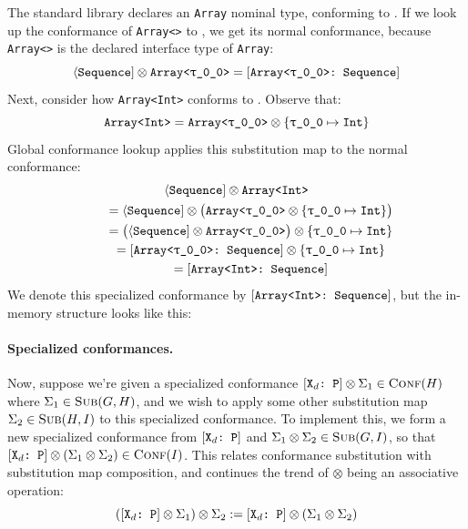 \documentclass[../generics]{subfiles}
\begin{document}
\begin{example}\label{specialized conf example}
The standard library declares an \texttt{Array} nominal type, conforming to \tSequence.
If we look up the conformance of \texttt{Array<\rT>} to \tSequence, we get its normal conformance, because \texttt{Array<\rT>} is the declared interface type of \texttt{Array}:
\[ \PSequence\otimes\texttt{Array<\rT>} = \ArraySequence \]
Next, consider how \texttt{Array<Int>} conforms to \tSequence. Observe that:
\[\texttt{Array<Int>} = \texttt{Array<\rT>} \otimes \SubMapInt\]
Global conformance lookup applies this substitution map to the normal conformance:
\begin{gather*}
\PSequence\otimes\texttt{Array<Int>}\\
\qquad {} = \PSequence\otimes\bigl(\texttt{Array<\rT>}\otimes\SubMapInt\bigr)\\
\qquad {} = \bigl(\PSequence\otimes\texttt{Array<\rT>}\bigr)\otimes\SubMapInt\\
\qquad {} = \ArraySequence\otimes\SubMapInt\\
\qquad {} = \ArrayIntSequence
\end{gather*}
We denote this specialized conformance by $[\texttt{Array<Int>:~Sequence}]$, but the in-memory structure looks like this:

\begin{center}
\end{center}
\end{example}

\paragraph{Specialized conformances.}
Now, suppose we're given a specialized conformance $[\texttt{$\texttt{X}_d$:~P}]\otimes\Sigma_1\in\textsc{Conf}({H})$ where $\Sigma_1\in\textsc{Sub}({G, H})$, and we wish to apply some other substitution map $\Sigma_2\in\textsc{Sub}({H, I})$ to this specialized conformance. To implement this, we form a new specialized conformance from $[\texttt{$\texttt{X}_d$:~P}]$ and $\Sigma_1 \otimes \Sigma_2 \in \textsc{Sub}({G, I})$, so that $[\texttt{$\texttt{X}_d$:~P}] \otimes (\Sigma_1\otimes\Sigma_2) \in \textsc{Conf}({I})$. This relates conformance substitution with substitution map composition, and continues the trend of $\otimes$ being an associative operation:
\[([\texttt{$\texttt{X}_d$:~P}]\otimes\Sigma_1)\otimes\Sigma_2 := [\texttt{$\texttt{X}_d$:~P}]\otimes(\Sigma_1\otimes\Sigma_2)\]
\end{document}
